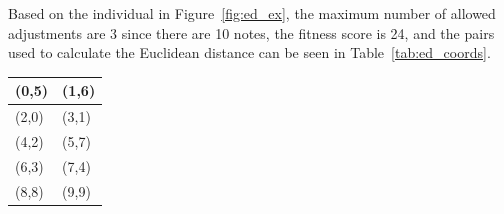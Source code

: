 \documentclass[12pt]{article} %
\begin{document}
Based on the individual in Figure~\ref{fig:ed_ex}, the maximum number of allowed adjustments are 3 since there are 10 notes, the fitness score is 24, and the pairs used to calculate the Euclidean distance can be seen in Table~\ref{tab:ed_coords}.
\begin{center}
 \label{tab:ed_coords} 
    \begin{tabular}{|l|l|}
        \hline
        (0,5) & (1,6) \\ \hline
        (2,0) & (3,1) \\ \hline
        (4,2) & (5,7) \\ \hline
        (6,3) & (7,4) \\ \hline
        (8,8) & (9,9) \\ \hline
    \end{tabular}
\end{center}
%
%
\end{document}
